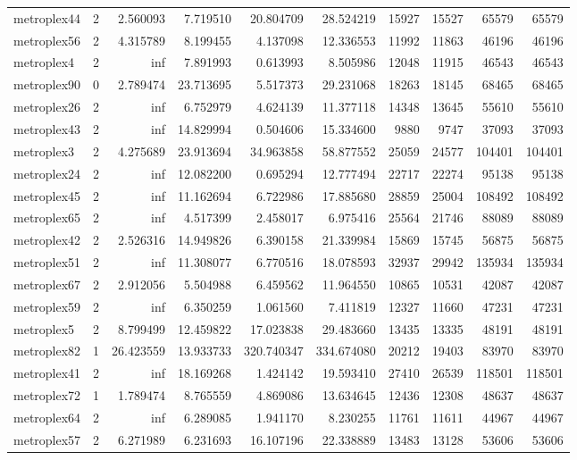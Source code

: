 \begin{longtable}{|l|r|r|r|r|r|r|r|r|r|}
metroplex44 & 2 & 2.560093 & 7.719510 & 20.804709 & 28.524219 & 15927 & 15527 & 65579 & 65579 \\
metroplex56 & 2 & 4.315789 & 8.199455 & 4.137098 & 12.336553 & 11992 & 11863 & 46196 & 46196 \\
metroplex4 & 2 & inf & 7.891993 & 0.613993 & 8.505986 & 12048 & 11915 & 46543 & 46543 \\
metroplex90 & 0 & 2.789474 & 23.713695 & 5.517373 & 29.231068 & 18263 & 18145 & 68465 & 68465 \\
metroplex26 & 2 & inf & 6.752979 & 4.624139 & 11.377118 & 14348 & 13645 & 55610 & 55610 \\
metroplex43 & 2 & inf & 14.829994 & 0.504606 & 15.334600 & 9880 & 9747 & 37093 & 37093 \\
metroplex3 & 2 & 4.275689 & 23.913694 & 34.963858 & 58.877552 & 25059 & 24577 & 104401 & 104401 \\
metroplex24 & 2 & inf & 12.082200 & 0.695294 & 12.777494 & 22717 & 22274 & 95138 & 95138 \\
metroplex45 & 2 & inf & 11.162694 & 6.722986 & 17.885680 & 28859 & 25004 & 108492 & 108492 \\
metroplex65 & 2 & inf & 4.517399 & 2.458017 & 6.975416 & 25564 & 21746 & 88089 & 88089 \\
metroplex42 & 2 & 2.526316 & 14.949826 & 6.390158 & 21.339984 & 15869 & 15745 & 56875 & 56875 \\
metroplex51 & 2 & inf & 11.308077 & 6.770516 & 18.078593 & 32937 & 29942 & 135934 & 135934 \\
metroplex67 & 2 & 2.912056 & 5.504988 & 6.459562 & 11.964550 & 10865 & 10531 & 42087 & 42087 \\
metroplex59 & 2 & inf & 6.350259 & 1.061560 & 7.411819 & 12327 & 11660 & 47231 & 47231 \\
metroplex5 & 2 & 8.799499 & 12.459822 & 17.023838 & 29.483660 & 13435 & 13335 & 48191 & 48191 \\
metroplex82 & 1 & 26.423559 & 13.933733 & 320.740347 & 334.674080 & 20212 & 19403 & 83970 & 83970 \\
metroplex41 & 2 & inf & 18.169268 & 1.424142 & 19.593410 & 27410 & 26539 & 118501 & 118501 \\
metroplex72 & 1 & 1.789474 & 8.765559 & 4.869086 & 13.634645 & 12436 & 12308 & 48637 & 48637 \\
metroplex64 & 2 & inf & 6.289085 & 1.941170 & 8.230255 & 11761 & 11611 & 44967 & 44967 \\
metroplex57 & 2 & 6.271989 & 6.231693 & 16.107196 & 22.338889 & 13483 & 13128 & 53606 & 53606 \\

\end{longtable}
